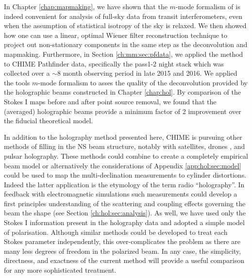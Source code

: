 In Chapter \ref{chap:mapmaking}, we have shown that the $m$-mode formalism of \cite{mmodes1, mmodes2} is indeed convenient for analysis of full-sky data from transit interferometers, even when the assumption of statistical isotropy of the sky is relaxed. We then showed how one can use a linear, optimal Wiener filter reconstruction technique to project out non-stationary components in the same step as the deconvolution and mapmaking. Furthermore, in Section \ref{ch:mm:sec:pfdata}, we applied the method to CHIME Pathfinder data, specifically the pass1-2 night stack which was collected over a $\sim$8 month observing period in late 2015 and 2016. We applied the tools $m$-mode formalism to asses the quality of the deconvolution provided by the holographic beams constructed in Chapter \ref{chap:hol}. By comparison of the Stokes I maps before and after point source removal, we found that the (averaged) holographic beams provide a minimum factor of 2 improvement over the fiducial theoretical model.

In addition to the holography method presented here, CHIME is pursuing other methods of filling in the NS beam structure, notably with satellites\citep{hol2, sat2}, drones \citep{drone}, and pulsar holography. These methods could combine to create a completely empirical beam model or alternatively the considerations of Appendix \ref{app:hol:sec:model} could be used to map the multi-declination measurements to cylinder distortions. Indeed the latter application is the etymology of the term radio ``holography''. In feedback with electromagnetic simulations such measurements could develop a first principles understanding of the scattering and coupling effects governing the beam the shape (see Section \ref{ch:hol:sec:analysis}). As well, we have used only the Stokes I information present in the holography data and adopted a simple model of polarisation. Although similar methods could be developed to treat each Stokes parameter independently, this over-complicates the problem as there are many less degrees of freedom in the polarized beam\citep{holpol}. In any case, the simplicity, directness, and exactness of the current method will provide a useful comparison for any more sophisticated treatment.

